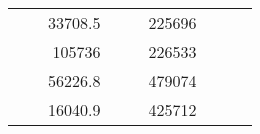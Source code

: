 \begin{table}[]
\begin{tabular}{|ccrccrccr}
\multicolumn{1}{|c|}{\cellcolor[HTML]{FFFFC7}}                                & \multicolumn{1}{c|}{\cellcolor[HTML]{DAE8FC}}                      & \multicolumn{1}{r|}{\cellcolor[HTML]{DAE8FC}33708.5}   & \multicolumn{1}{c|}{\cellcolor[HTML]{FFFFC7}}                                & \multicolumn{1}{c|}{\cellcolor[HTML]{DAE8FC}}                       & \multicolumn{1}{r|}{\cellcolor[HTML]{DDFDFF}225696}    &                                                                              &                                                                    &                                                        \\ \cline{3-3} \cline{6-6}
\multicolumn{1}{|c|}{\cellcolor[HTML]{FFFFC7}}                                & \multicolumn{1}{c|}{\cellcolor[HTML]{DAE8FC}}                      & \multicolumn{1}{r|}{\cellcolor[HTML]{DDFDFF}105736}    & \multicolumn{1}{c|}{\cellcolor[HTML]{FFFFC7}}                                & \multicolumn{1}{c|}{\cellcolor[HTML]{DAE8FC}}                       & \multicolumn{1}{r|}{\cellcolor[HTML]{DAE8FC}226533}    &                                                                              &                                                                    &                                                        \\ \cline{3-3} \cline{6-6}
\multicolumn{1}{|c|}{\cellcolor[HTML]{FFFFC7}}                                & \multicolumn{1}{c|}{\cellcolor[HTML]{DAE8FC}}                      & \multicolumn{1}{r|}{\cellcolor[HTML]{DAE8FC}56226.8}   & \multicolumn{1}{c|}{\cellcolor[HTML]{FFFFC7}}                                & \multicolumn{1}{c|}{\cellcolor[HTML]{DAE8FC}}                       & \multicolumn{1}{r|}{\cellcolor[HTML]{DDFDFF}479074}    &                                                                              &                                                                    &                                                        \\ \cline{3-3} \cline{6-6}
\multicolumn{1}{|c|}{\cellcolor[HTML]{FFFFC7}}                                & \multicolumn{1}{c|}{\cellcolor[HTML]{DAE8FC}}                      & \multicolumn{1}{r|}{\cellcolor[HTML]{DDFDFF}16040.9}   & \multicolumn{1}{c|}{\cellcolor[HTML]{FFFFC7}}                                & \multicolumn{1}{c|}{\cellcolor[HTML]{DAE8FC}}                       & \multicolumn{1}{r|}{\cellcolor[HTML]{DAE8FC}425712}    &                                                                              &                                                                    &                                                        \\ \cline{3-3} \cline{6-6}

\end{tabular}
\end{table}
